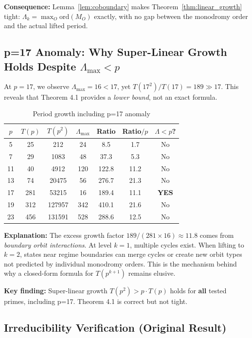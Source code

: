 \documentclass[11pt]{article}
\theoremstyle{plain}
\theoremstyle{definition}
\begin{document}
\textbf{Consequence:} Lemma~\ref{lem:coboundary} makes Theorem~\ref{thm:linear_growth} tight: $\Lambda_k = \max_O \mathrm{ord}(M_O)$ exactly, with no gap between the monodromy order and the actual lifted period.

\subsection{p=17 Anomaly: Why Super-Linear Growth Holds Despite $\Lambda_{\max} < p$}
\label{app:p17}

At $p=17$, we observe $\Lambda_{\max} = 16 < 17$, yet $T(17^2)/T(17) = 189 \gg 17$. This reveals that Theorem 4.1 provides a \emph{lower bound}, not an exact formula.

\begin{table}[h]
\centering
\caption{Period growth including p=17 anomaly}
\begin{tabular}{ccccccc}
\toprule
$p$ & $T(p)$ & $T(p^2)$ & $\Lambda_{\max}$ & Ratio & Ratio$/p$ & $\Lambda < p$? \\
\midrule
5 & 25 & 212 & 24 & 8.5 & 1.7 & No \\
7 & 29 & 1083 & 48 & 37.3 & 5.3 & No \\
11 & 40 & 4912 & 120 & 122.8 & 11.2 & No \\
13 & 74 & 20475 & 56 & 276.7 & 21.3 & No \\
17 & 281 & 53215 & 16 & 189.4 & 11.1 & \textbf{YES} \\
19 & 312 & 127957 & 342 & 410.1 & 21.6 & No \\
23 & 456 & 131591 & 528 & 288.6 & 12.5 & No \\
\bottomrule
\end{tabular}
\end{table}

\textbf{Explanation:} The excess growth factor $189/(281 \times 16) \approx 11.8$ comes from \emph{boundary orbit interactions}. At level $k=1$, multiple cycles exist. When lifting to $k=2$, states near regime boundaries can merge cycles or create new orbit types not predicted by individual monodromy orders. This is the mechanism behind why a closed-form formula for $T(p^{k+1})$ remains elusive.

\textbf{Key finding:} Super-linear growth $T(p^2) > p \cdot T(p)$ holds for \textbf{all} tested primes, including p=17. Theorem 4.1 is correct but not tight.

\subsection{Irreducibility Verification (Original Result)}
\label{app:irreducibility}
\end{document}
